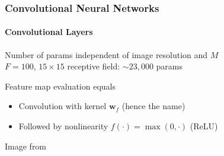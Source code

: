 \documentclass[xetex,professionalfont]{beamer}
\renewcommand{\vec}[1]{\ensuremath{\mathbf{#1}}}
\newcommand{\vw}{\vec{w}}
\begin{document}
\begin{frame}
\frametitle{Convolutional Neural Networks}
\framesubtitle{Convolutional Layers}


Number of params independent of image resolution and $M$\\\medskip
$F=100$, $15\times15$ receptive field: $\sim23,000$ params

\bigskip
Feature map evaluation equals
\begin{itemize}
    \item Convolution with kernel $\vw_f$ (hence the name) %
    \item Followed by nonlinearity $f(\cdot)=\max(0,\cdot)$ (ReLU) %
\end{itemize}

\medskip
\begin{center}
    {\centering Image from \cite{krizhevsky2012}}
\end{center}

\end{frame}

\end{document}
